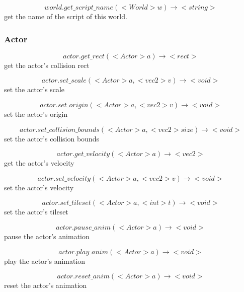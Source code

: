 \documentclass[11pt,fleqn]{book} %
\begin{document}
\begin{equation}
world.get\_script\_name(<World> w) \rightarrow <string>
\end{equation}
get the name of the script of this world.

\subsubsection{Actor}
\begin{equation}
actor.get\_rect(<Actor> a) \rightarrow <rect>
\end{equation}
get the actor's collision rect

\begin{equation}
actor.set\_scale(<Actor> a, <vec2> v) \rightarrow <void>
\end{equation}
set the actor's scale

\begin{equation}
actor.set\_origin(<Actor> a, <vec2> v) \rightarrow <void>
\end{equation}
set the actor's origin

\begin{equation}
actor.set\_collision\_bounds(<Actor> a, <vec2> size) \rightarrow <void>
\end{equation}
set the actor's collision bounds

\begin{equation}
actor.get\_velocity(<Actor> a) \rightarrow <vec2>
\end{equation}
get the actor's velocity

\begin{equation}
actor.set\_velocity(<Actor> a, <vec2> v) \rightarrow <void>
\end{equation}
set the actor's velocity

\begin{equation}
actor.set\_tileset(<Actor> a, <int> t) \rightarrow <void>
\end{equation}
set the actor's tileset

\begin{equation}
actor.pause\_anim(<Actor> a) \rightarrow <void>
\end{equation}
pause the actor's animation

\begin{equation}
actor.play\_anim(<Actor> a) \rightarrow <void>
\end{equation}
play the actor's animation

\begin{equation}
actor.reset\_anim(<Actor> a) \rightarrow <void>
\end{equation}
reset the actor's animation
\end{document}
